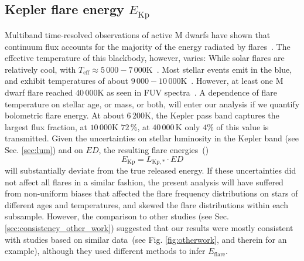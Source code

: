 \documentclass{aa}
\begin{document}
\subsection{Kepler flare energy $E_\mathrm{Kp}$}
Multiband time-resolved observations of active M dwarfs have shown that continuum flux accounts for the majority  of the energy radiated by flares~\citep{kowalski2013}. %
The effective temperature of this blackbody, however, varies:
While solar flares are relatively cool, with \mbox{$T_\mathrm{eff}\approx5\,000-7\,000 $\;K}~\citep{kleint_solarstellarwlf_2016, kerr_solarstellarwlf_2014, watanabe_solarstellarwlf_2013, namekata_solarstellarwlf_2017}. Most stellar events emit in the blue, and exhibit temperatures of about $9\,000-10\,000$\;K~\citep{1992ApJS...78..565H, kretzschmar_sun_2011, davenport_multi-wavelength_2012, shibayama2013}. However, at least one M dwarf flare reached $40\,000$\;K as seen in FUV spectra~\citep{froning_40000_2019}.
A dependence of flare temperature on stellar age, or mass, or both, will enter our analysis if we quantify bolometric flare energy. At about $6\,200$\;K, the Kepler pass band captures the largest flux fraction, at $10\,000$\;K $72\,\%$, at $40\,000$\,K only $4\%$ of this value is transmitted. 
Given the uncertainties on stellar luminosity in the Kepler band (see Sec. \ref{sec:lum}) and on $ED$, the resulting flare energies~()
\begin{equation}
E_\mathrm{Kp} = L_\mathrm{Kp,*} \cdot ED
\end{equation}  
will substantially deviate from the true released energy. If these uncertainties did not affect all flares in a similar fashion, the present analysis will have suffered from non-uniform biases that affected the flare frequency distributions on stars of different ages and temperatures, and skewed the flare distributions within each subsample. However, the comparison to other studies (see Sec. \ref{sec:consistency_other_work}) suggested that our results were mostly consistent with studies based on similar data~(see Fig. \ref{fig:otherwork}, and \citealt{lin2019} therein for an example), although they used different methods to infer $E_\mathrm{flare}$.  
\end{document}
